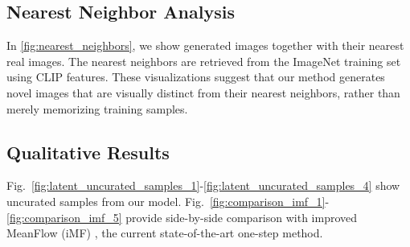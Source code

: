 \subsection{Nearest Neighbor Analysis}

In \cref{fig:nearest_neighbors}, we show generated images together with their nearest real images. The nearest neighbors are retrieved from the ImageNet training set using CLIP features. 
These visualizations suggest that our method generates novel images that are visually distinct from their nearest neighbors, rather than merely memorizing training samples.

\subsection{Qualitative Results}
\label{sec:appendix_qualitative_results}

Fig.~\ref{fig:latent_uncurated_samples_1}-\ref{fig:latent_uncurated_samples_4} show uncurated samples from our model.
Fig.~\ref{fig:comparison_imf_1}-\ref{fig:comparison_imf_5} provide side-by-side comparison with improved MeanFlow (iMF) \cite{geng2025improved}, the current state-of-the-art one-step method.